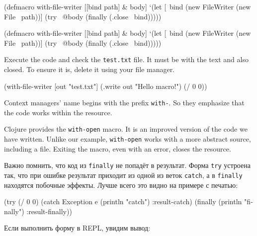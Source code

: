 
\ifnarrow

\begin{clojure}
(defmacro with-file-writer
  [[bind path] & body]
  `(let [~bind (new FileWriter
                 (new File ~path))]
     (try
       ~@body
       (finally
         (.close ~bind)))))
\end{clojure}

\else

\begin{clojure}
(defmacro with-file-writer
  [[bind path] & body]
  `(let [~bind (new FileWriter (new File ~path))]
     (try
       ~@body
       (finally
         (.close ~bind)))))
\end{clojure}

\fi

Execute the code and check the \verb|test.txt| file. It must be with the text and also closed. To ensure it is, delete it using your file manager.

\begin{clojure}
(with-file-writer [out "test.txt"]
  (.write out "Hello macro!")
  (/ 0 0))
\end{clojure}

Context managers' name begins with the prefix \verb|with-|. So they emphasize that the code works within the resource.


Clojure provides the \verb|with-open| macro. It is an improved version of the code we have written. Unlike our example, \verb|with-open| works with a more abstract source, including a file. Exiting the macro, even with an error, closes the resource.


Важно помнить, что код из \verb|finally| не попадёт в результат. Форма
\verb|try| устроена так, что при ошибке результат приходит из одной из веток
\verb|catch|, а в \verb|finally| находятся побочные эффекты. Лучше всего это
видно на примере с печатью:

\begin{english}
  \begin{clojure}
(try (/ 0 0)
     (catch Exception e
       (println "catch")
       :result-catch)
     (finally
       (println "finally")
       :result-finally))
  \end{clojure}
\end{english}

\noindentnarrow
Если выполнить форму в REPL, увидим вывод:

